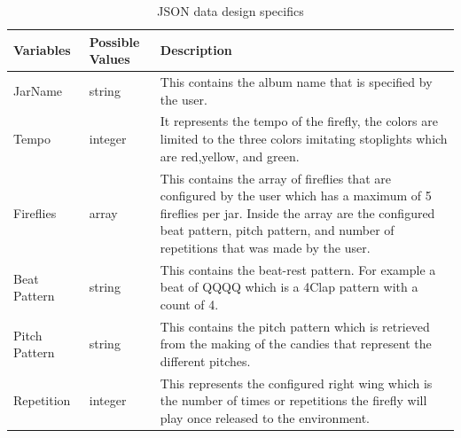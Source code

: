 \begin{landscape}
\begin{table}
\centering
\caption{JSON data design specifics}
\label{XML}
\begin{tabular}{|p{2.8cm}|p{6.6cm}|p{9cm}|} 
\hline
\textbf{Variables} & \textbf{Possible Values}  & \textbf{Description}                                                                                                                                                                                                                    \\ 
\hline
JarName~~          & string~                   & This contains the album name that is specified by the user.                                                                                                                                                                             \\ 
\hline
Tempo              & integer~                  & It represents the tempo of the firefly, the colors are limited to the three colors imitating stoplights which are red,yellow, and green.                                                                                                \\ 
\hline
Fireflies          & array~                    & This contains the array of fireflies that are configured by the user which has a maximum of 5 fireflies per jar. Inside the array are the configured beat pattern, pitch pattern, and number of repetitions that was made by the user.  \\ 
\hline
Beat Pattern       & string                    & This contains the beat-rest pattern. For example a beat of QQQQ which is a 4Clap pattern with a count of 4.                                                                                                                             \\ 
\hline
Pitch Pattern      & string                    & This contains the pitch pattern which is retrieved from the making of the candies that represent the different pitches.                                                                                                                 \\ 
\hline
Repetition         & integer                   & This represents the configured right wing which is the number of times or repetitions the firefly will play once released to the environment.                                                                                           \\
\hline
\end{tabular}
\end{table}
\end{landscape}

